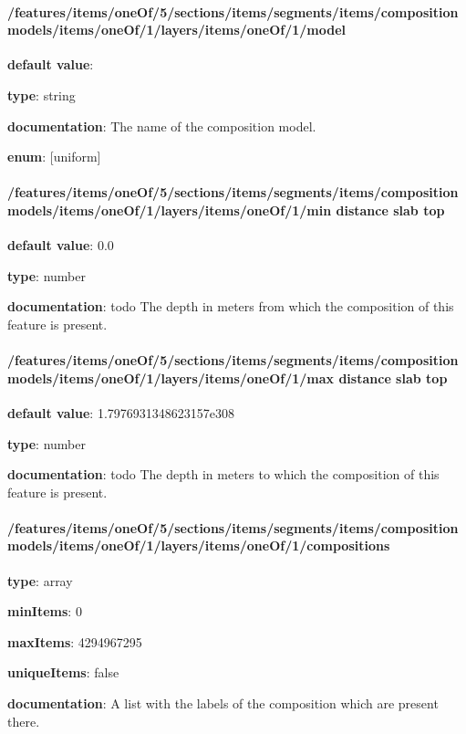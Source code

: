 \paragraph{/features/items/oneOf/5/sections/items/segments/items/composition models/items/oneOf/1/layers/items/oneOf/1/model} \begin{itemized}
\item {\bf default value}: 
\item {\bf type}: string
\item {\bf documentation}: The name of the composition model.
\item {\bf enum}: [uniform]\end{itemized}\paragraph{/features/items/oneOf/5/sections/items/segments/items/composition models/items/oneOf/1/layers/items/oneOf/1/min distance slab top} \begin{itemized}
\item {\bf default value}: 0.0
\item {\bf type}: number
\item {\bf documentation}: todo The depth in meters from which the composition of this feature is present.
\end{itemized}\paragraph{/features/items/oneOf/5/sections/items/segments/items/composition models/items/oneOf/1/layers/items/oneOf/1/max distance slab top} \begin{itemized}
\item {\bf default value}: 1.7976931348623157e308
\item {\bf type}: number
\item {\bf documentation}: todo The depth in meters to which the composition of this feature is present.
\end{itemized}\paragraph{/features/items/oneOf/5/sections/items/segments/items/composition models/items/oneOf/1/layers/items/oneOf/1/compositions} \begin{itemized}
\item {\bf type}: array
\item {\bf minItems}: 0
\item {\bf maxItems}: 4294967295
\item {\bf uniqueItems}: false
\item {\bf documentation}: A list with the labels of the composition which are present there.

\end{itemized}
